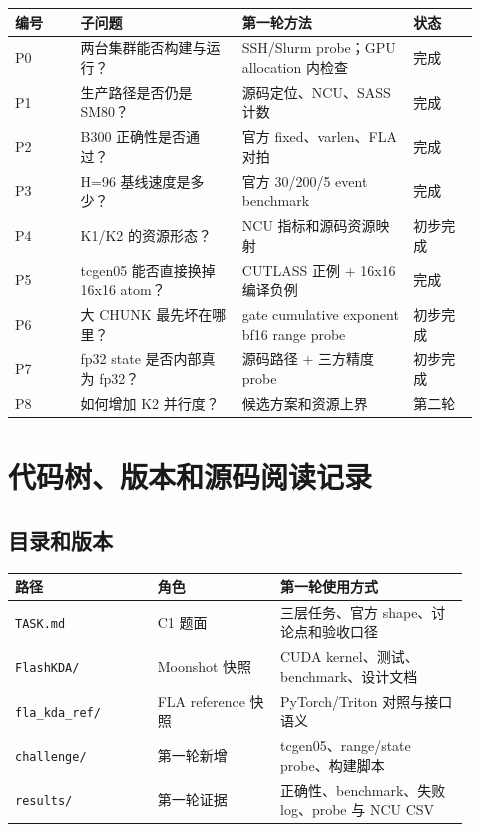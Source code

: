 \documentclass[11pt,a4paper,fontset=none]{ctexart}
\newcommand{\code}[1]{\texttt{#1}}
\begin{document}
\begin{longtable}{@{}L{0.13\linewidth}L{0.32\linewidth}L{0.34\linewidth}L{0.13\linewidth}@{}}
\toprule
编号 & 子问题 & 第一轮方法 & 状态 \\
\midrule
\endhead
\bottomrule
\endlastfoot
P0 & 两台集群能否构建与运行？ & SSH/Slurm probe；GPU allocation 内检查 & 完成 \\
P1 & 生产路径是否仍是 SM80？ & 源码定位、NCU、SASS 计数 & 完成 \\
P2 & B300 正确性是否通过？ & 官方 fixed、varlen、FLA 对拍 & 完成 \\
P3 & H=96 基线速度是多少？ & 官方 30/200/5 event benchmark & 完成 \\
P4 & K1/K2 的资源形态？ & NCU 指标和源码资源映射 & 初步完成 \\
P5 & tcgen05 能否直接换掉 16x16 atom？ & CUTLASS 正例 + 16x16 编译负例 & 完成 \\
P6 & 大 CHUNK 最先坏在哪里？ & gate cumulative exponent bf16 range probe & 初步完成 \\
P7 & fp32 state 是否内部真为 fp32？ & 源码路径 + 三方精度 probe & 初步完成 \\
P8 & 如何增加 K2 并行度？ & 候选方案和资源上界 & 第二轮 \\
\end{longtable}

\section{代码树、版本和源码阅读记录}

\subsection{目录和版本}

\begin{longtable}{@{}L{0.29\linewidth}L{0.24\linewidth}L{0.37\linewidth}@{}}
\toprule
路径 & 角色 & 第一轮使用方式 \\
\midrule
\endhead
\bottomrule
\endlastfoot
\code{TASK.md} & C1 题面 & 三层任务、官方 shape、讨论点和验收口径 \\
\code{FlashKDA/} & Moonshot 快照 & CUDA kernel、测试、benchmark、设计文档 \\
\code{fla\_kda\_ref/} & FLA reference 快照 & PyTorch/Triton 对照与接口语义 \\
\code{challenge/} & 第一轮新增 & tcgen05、range/state probe、构建脚本 \\
\code{results/} & 第一轮证据 & 正确性、benchmark、失败 log、probe 与 NCU CSV \\
\end{longtable}
\end{document}
